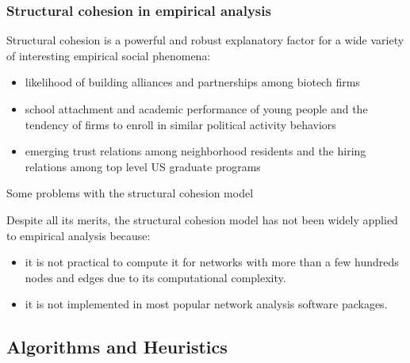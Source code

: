 \documentclass[ignorenonframetext,red,8pt,notes=hide]{beamer}
\begin{document}
\begin{frame}
\frametitle{Structural cohesion in empirical analysis}

Structural cohesion is a powerful and robust explanatory factor for a wide variety of interesting empirical social phenomena: 

\begin{itemize}

\item likelihood of building alliances and partnerships among biotech firms \citep{powell:2005}

\item school attachment and academic performance of young people and the tendency of firms to enroll in similar political activity behaviors \citep{moody:2003}

\item emerging trust relations among neighborhood residents and the hiring relations among top level US graduate programs \citep{grannis:2009}

\end{itemize}

\pause

\begin{block}{Some problems with the structural cohesion model}

Despite all its merits, the structural cohesion model has not been widely applied to empirical analysis because:

\begin{itemize}

\item it is not practical to compute it for networks with more than a few hundreds nodes and edges due to its computational complexity.

\item it is not implemented in most popular network analysis software packages.

\end{itemize}
\end{block}
\end{frame}

\subsection{Algorithms and Heuristics}
\end{document}

